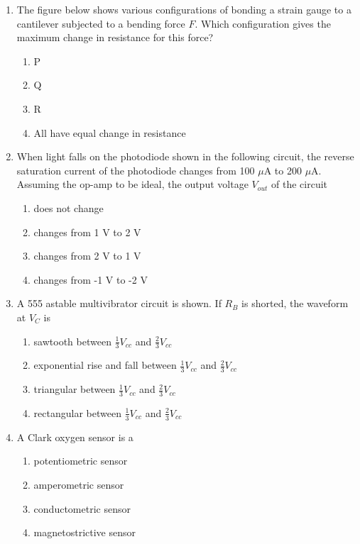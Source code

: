 \documentclass[journal]{IEEEtran}
\begin{document}
\begin{enumerate}
\item The figure below shows various configurations of bonding a strain gauge to a cantilever subjected to a bending force $F$.  
Which configuration gives the maximum change in resistance for this force?
\begin{enumerate}
\item P  
\item Q  
\item R  
\item All have equal change in resistance
\end{enumerate}

\item When light falls on the photodiode shown in the following circuit, the reverse saturation current of the photodiode changes from 100 $\mu$A to 200 $\mu$A.  
Assuming the op-amp to be ideal, the output voltage $V_{out}$ of the circuit
\begin{enumerate}
\item does not change  
\item changes from 1 V to 2 V  
\item changes from 2 V to 1 V  
\item changes from -1 V to -2 V
\end{enumerate}


\item A 555 astable multivibrator circuit is shown.  
If $R_B$ is shorted, the waveform at $V_C$ is
\begin{multicols}{2}
\begin{enumerate}
\item sawtooth between $\tfrac{1}{3}V_{cc}$ and $\tfrac{2}{3}V_{cc}$  
\item exponential rise and fall between $\tfrac{1}{3}V_{cc}$ and $\tfrac{2}{3}V_{cc}$  
\item triangular between $\tfrac{1}{3}V_{cc}$ and $\tfrac{2}{3}V_{cc}$  
\item rectangular between $\tfrac{1}{3}V_{cc}$ and $\tfrac{2}{3}V_{cc}$  
\end{enumerate}
\end{multicols}

\item A Clark oxygen sensor is a
\begin{multicols}{2}
\begin{enumerate}
\item potentiometric sensor  
\item amperometric sensor  
\item conductometric sensor  
\item magnetostrictive sensor  
\end{enumerate}
\end{multicols}


\end{enumerate}
\end{document}
